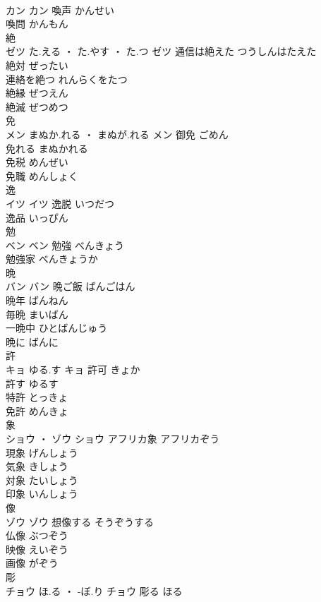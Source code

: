 \documentclass[8pt]{extreport}
\begin{document}
\begin{CJK}{UTF8}{min}
\\	カン		カン	喚声	かんせい	
\\	喚問	かんもん	
\\	絶	
\\	ゼツ	た.える ・ た.やす ・ た.つ	ゼツ	通信は絶えた	つうしんはたえた	
\\	絶対	ぜったい	
\\	連絡を絶つ	れんらくをたつ	
\\	絶縁	ぜつえん	
\\	絶滅	ぜつめつ	
\\	免	
\\	メン	まぬか.れる ・ まぬが.れる	メン	御免	ごめん	
\\	免れる	まぬかれる	
\\	免税	めんぜい	
\\	免職	めんしょく	
\\	逸	
\\	イツ		イツ	逸脱	いつだつ	
\\	逸品	いっぴん	
\\	勉	
\\	ベン		ベン	勉強	べんきょう	
\\	勉強家	べんきょうか	
\\	晩	
\\	バン		バン	晩ご飯	ばんごはん	
\\	晩年	ばんねん	
\\	毎晩	まいばん	
\\	一晩中	ひとばんじゅう	
\\	晩に	ばんに	
\\	許	
\\	キョ	ゆる.す	キョ	許可	きょか	
\\	許す	ゆるす	
\\	特許	とっきょ	
\\	免許	めんきょ	
\\	象	
\\	ショウ ・ ゾウ		ショウ	アフリカ象	アフリカぞう	
\\	現象	げんしょう	
\\	気象	きしょう	
\\	対象	たいしょう	
\\	印象	いんしょう	
\\	像	
\\	ゾウ		ゾウ	想像する	そうぞうする	
\\	仏像	ぶつぞう	
\\	映像	えいぞう	
\\	画像	がぞう	
\\	彫	
\\	チョウ	ほ.る ・ -ぼ.り	チョウ	彫る	ほる	

\end{CJK}
\end{document}
